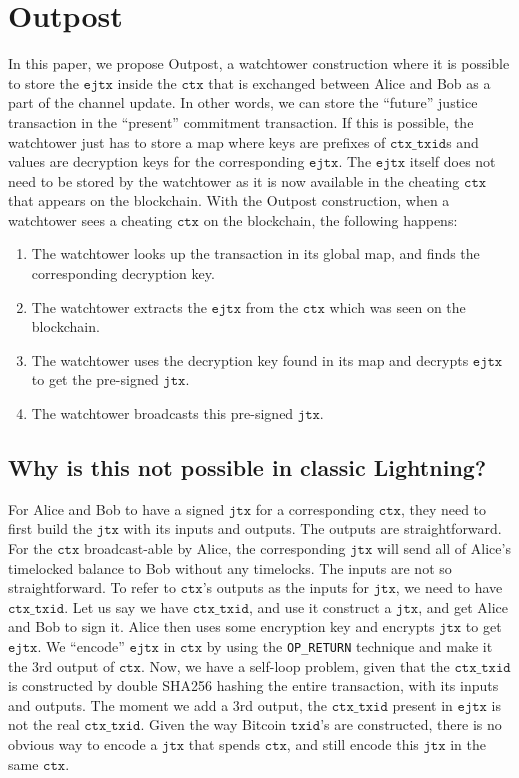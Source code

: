 \section{Outpost} %
In this paper, we propose Outpost, a watchtower construction where it is possible to store the $\texttt{ejtx}$ inside the $\texttt{ctx}$ that is exchanged between Alice and Bob as a part of the channel update. In other words, we can store the ``future'' justice transaction in the ``present'' commitment transaction. If this is possible, the watchtower just has to store a map where keys are prefixes of $\texttt{ctx\_txid}$s and values are decryption keys for the corresponding $\texttt{ejtx}$. The $\texttt{ejtx}$ itself does not need to be stored by the watchtower as it is now available in the cheating $\texttt{ctx}$ that appears on the blockchain. With the Outpost construction, when a watchtower sees a cheating $\texttt{ctx}$ on the blockchain, the following happens:
\begin{enumerate}
\item The watchtower looks up the transaction in its global map, and finds the corresponding decryption key.
\item The watchtower extracts the $\texttt{ejtx}$ from the $\texttt{ctx}$ which was seen on the blockchain.
\item The watchtower uses the decryption key found in its map and decrypts $\texttt{ejtx}$ to get the pre-signed $\texttt{jtx}$.
\item The watchtower broadcasts this pre-signed $\texttt{jtx}$.
\end{enumerate}

\subsection{Why is this not possible in classic Lightning?}

For Alice and Bob to have a signed $\texttt{jtx}$ for a corresponding $\texttt{ctx}$, they need to first build the $\texttt{jtx}$ with its inputs and outputs. The outputs are straightforward. For the $\texttt{ctx}$ broadcast-able by Alice, the corresponding $\texttt{jtx}$ will send all of Alice's timelocked balance to Bob without any timelocks. The inputs are not so straightforward. To refer to $\texttt{ctx}$'s outputs as the inputs for $\texttt{jtx}$, we need to have $\texttt{ctx\_txid}$. Let us say we have $\texttt{ctx\_txid}$, and use it construct a $\texttt{jtx}$, and get Alice and Bob to sign it. Alice then uses some encryption key and encrypts $\texttt{jtx}$ to get $\texttt{ejtx}$. We ``encode'' $\texttt{ejtx}$ in $\texttt{ctx}$ by using the \texttt{OP\_RETURN} technique and make it the 3rd output of $\texttt{ctx}$. Now, we have a self-loop problem, given that the $\texttt{ctx\_txid}$ is constructed by double SHA256 hashing the entire transaction, with its inputs and outputs. The moment we add a 3rd output, the $\texttt{ctx\_txid}$ present in $\texttt{ejtx}$ is not the real $\texttt{ctx\_txid}$. Given the way Bitcoin $\texttt{txid}$'s are constructed, there is no obvious way to encode a $\texttt{jtx}$ that spends $\texttt{ctx}$, and still encode this $\texttt{jtx}$ in the same $\texttt{ctx}$.

